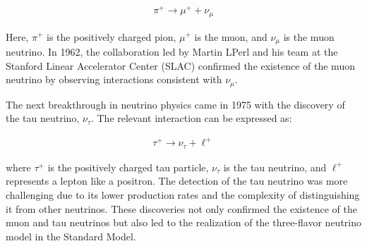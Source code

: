 \begin{align}
  \pi^+ \rightarrow \mu^+ + \nu_\mu
\end{align}

Here, $\pi^+$ is the positively charged pion, $\mu^+$ is the muon, and $\nu_\mu$ is the muon neutrino.
In 1962, the collaboration led by Martin LPerl and his team at the Stanford Linear Accelerator Center (SLAC) confirmed the existence of the muon neutrino by observing interactions consistent with $\nu_\mu$.

The next breakthrough in neutrino physics came in 1975 with the discovery of the tau neutrino, $\nu_\tau$.
The relevant interaction can be expressed as:

\begin{align}
  \tau^+ \rightarrow \nu_\tau + \ell^+
\end{align}

where $\tau^+$ is the positively charged tau particle, $\nu_\tau$ is the tau neutrino, and $\ell^+$ represents a lepton like a positron.
The detection of the tau neutrino was more challenging due to its lower production rates and the complexity of distinguishing it from other neutrinos.
These discoveries not only confirmed the existence of the muon and tau neutrinos but also led to the realization of the three-flavor neutrino model in the Standard Model.

